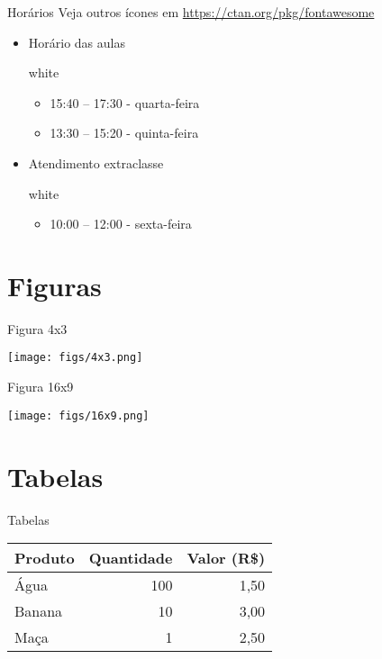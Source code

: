 \documentclass{beamer}
\begin{document}
\begin{frame}{Horários}
    {Veja outros ícones em \url{https://ctan.org/pkg/fontawesome}}
    \begin{itemize}
        \item Horário das aulas 
        \begin{caixa}[azul]{white}{\faCalendar}
            \begin{itemize}
                \item 15:40 -- 17:30 - quarta-feira
                \item 13:30 -- 15:20 - quinta-feira
            \end{itemize}
        \end{caixa}
        \item Atendimento extraclasse
        \begin{caixa}[azul]{white}{\faCalendar}
            \begin{itemize}
                \item 10:00 -- 12:00 - sexta-feira
            \end{itemize}
        \end{caixa}
    \end{itemize}
\end{frame}


\section{Figuras}

\begin{frame}{Figura 4x3}
    \begin{center}
        \texttt{[image: figs/4x3.png]}
    \end{center}
\end{frame}
    

\begin{frame}{Figura 16x9}
\begin{center}
    \texttt{[image: figs/16x9.png]}
\end{center}
\end{frame}

\section{Tabelas}

\begin{frame}{Tabelas}
\begin{center}
    \begin{tabular}{l r r}\\\toprule
        Produto & Quantidade & Valor (R\$) \\\midrule
        Água    &      100   &   1,50 \\ 
        Banana  &       10   &   3,00 \\
        Maça    &        1   &   2,50 \\ \bottomrule
    \end{tabular}
\end{center}
\end{frame}
\end{document}
